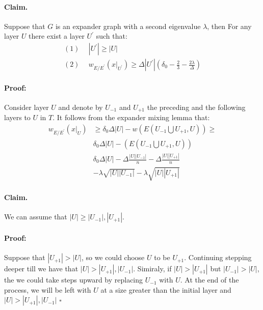 \documentclass{article}
\begin{document}
\begin{multicols*}{2}
  \paragraph{Claim.} Suppose that $G$ is an expander graph with a second eigenvalue $\lambda$, then For any layer $U$ there exist a layer $U^{\prime}$ such that:
  \begin{equation*}
    \begin{split}
      (1) & \ \ |U^{\prime}| \ge |U| \\
      (2) & \ \ w_{E/E^{\prime}}\left( x|_{U^{\prime}} \right)  \ge\Delta|U^{\prime}|\left( \delta_{0}-\frac{2}{3}-\frac{2\lambda}{\Delta} \right)
    \end{split}
  \end{equation*}
  \paragraph{Proof:} Consider layer $U$ and denote by $U_{-1}$ and $U_{+1}$ the preceding and the following layers to $U$ in $T$. It follows from the expander mixing lemma that:
  \begin{equation*}
    \begin{split}
      w_{E/E^{\prime}}\left( x|_{U} \right) & \ge \delta_{0}\Delta|U| -w\left( E(U_{-1} \bigcup U_{+1} ,U)  \right) \ge \\ 
      & \delta_{0}\Delta|U| -\left( E(U_{-1} \bigcup U_{+1} ,U)  \right) \\ 
      &  \delta_{0}\Delta|U| - \Delta\frac{|U||U_{-1}|}{n} - \Delta\frac{|U||U_{+1}|}{n} \\
      & -\lambda\sqrt{|U||U_{-1}|} - \lambda\sqrt{|U||U_{+1}|}
    \end{split}
  \end{equation*}

  \paragraph{Claim.} We can assume that $|U| \ge |U_{-1}|, |U_{+1}|$. 
  \paragraph{Proof:} Suppose that $|U_{+1}| > |U|$, so we could choose $U$ to be $U_{+1}$. Continuing stepping deeper till we have that $|U| > |U_{+1}|, |U_{-1}|$. Simiraly, if $|U| > |U_{+1}|$ but $|U_{-1}| > |U|$, the we could take steps upward by replacing $U_{-1}$ with $U$. At the end of the process, we will be left with $U$ at a size greater than the initial layer and $|U| > |U_{+1}|, |U_{-1}|$ $\square$


\end{multicols*}
\end{document}
